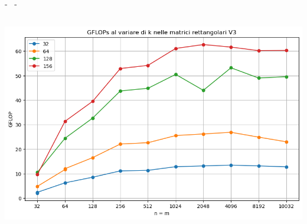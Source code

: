 \documentclass[compress]{beamer}
\begin{document}
\begin{frame}{\secname \text{ }- \subsecname\ \text{ }- \subsubsecname}
\begin{columns}
\begin{minipage}{0.8\textwidth}
\begin{adjustbox}{margin=1.5cm 0cm 0cm 0cm, center}
                \end{adjustbox}
            \end{minipage}
    \end{columns}
    \begin{minipage}{0.45\textwidth}
        \centering
        \begin{adjustbox}{margin=7cm 0cm 0cm 0.2cm, center} %
            \includegraphics[width=1.1\textwidth, frame]{resources/gpu_matrix_rect_perfv3.png}
        \end{adjustbox}
    \end{minipage}
\end{frame}
\end{document}
